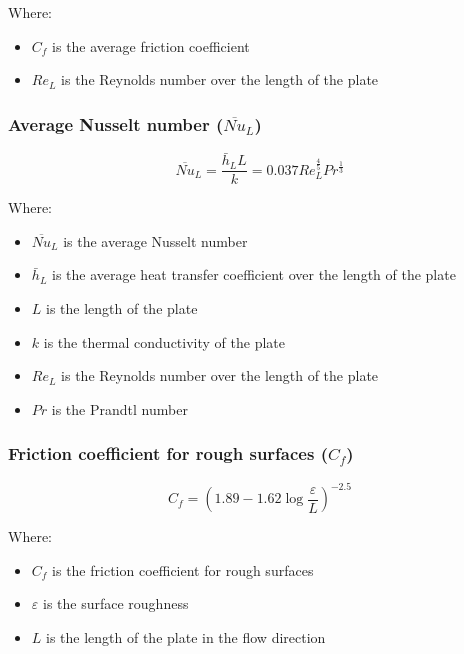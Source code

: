 \documentclass[11pt]{article}
\begin{document}
Where:
\begin{itemize}
\item \(C_f\) is the average friction coefficient
\item \(Re_L\) is the Reynolds number over the length of the plate
\end{itemize}

\subsubsection{Average Nusselt number (\(\overline{Nu}_L\))}
\label{sec:org7d57030}
\[\overline{Nu}_L = \frac{\bar{h}_L L}{k} = 0.037 Re_L^{\frac{4}{5}} Pr^{\frac{1}{3}}\]

Where:
\begin{itemize}
\item \(\overline{Nu}_L\) is the average Nusselt number
\item \(\bar{h}_L\) is the average heat transfer coefficient over the length of the plate
\item \(L\) is the length of the plate
\item \(k\) is the thermal conductivity of the plate
\item \(Re_L\) is the Reynolds number over the length of the plate
\item \(Pr\) is the Prandtl number
\end{itemize}

\subsubsection{Friction coefficient for rough surfaces (\(C_f\))}
\label{sec:orged0cf54}
\[C_f = \left(1.89 - 1.62 \log \frac{\varepsilon}{L} \right)^{-2.5}\]

Where:
\begin{itemize}
\item \(C_f\) is the friction coefficient for rough surfaces
\item \(\varepsilon\) is the surface roughness
\item \(L\) is the length of the plate in the flow direction
\end{itemize}
\end{document}
